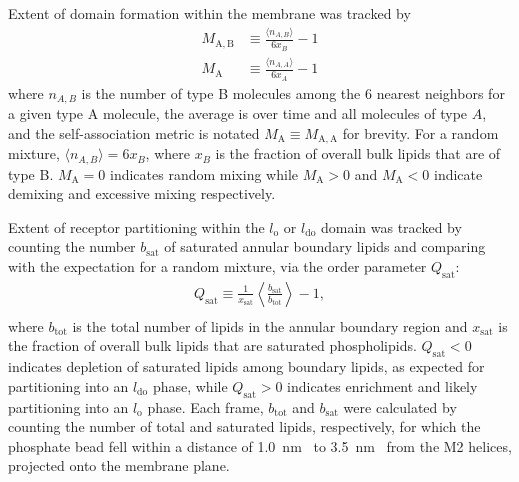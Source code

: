 \documentclass[final,3p,times,twocolumn]{elsarticle}
\newcommand{\bsat}{b_{\mathrm{sat}}}
\newcommand{\qsat}{Q_{\mathrm{sat}}}
\newcommand{\xsat}{x_{\mathrm{sat}}}
\newcommand{\nbound}{b_{\mathrm{tot}}}
\newcommand{\lo}{l_{\mathrm{o}}}
\newcommand{\ldo}{l_{\mathrm{do}}}
\newcommand{\m}[2]{M_{\mathrm{{#1},{#2}}}}
\newcommand{\mself}[1]{M_{\mathrm{#1}}}
\begin{document}
Extent of domain formation within the membrane was tracked by 
    \begin{equation}
    \begin{aligned}
      \m{A}{B} &\equiv \frac{\langle n_{A,B} \rangle} {6x_{B}} -1 \\
      \mself{A} &\equiv \frac{\langle n_{A,A} \rangle} {6x_{A}} -1 
    \end{aligned}
    \label{eq:M}
  \end{equation}
 where $n_{A,B}$ is the number of type B molecules among the 6 nearest neighbors for a given type A molecule,  the average is over time and all molecules of type $A$, and the self-association metric is notated $\mself{A} \equiv \m{A}{A}$ for brevity. For a random mixture, $\langle n_{A,B} \rangle = 6x_{B}$, where $x_{B}$ is the fraction of overall bulk lipids that are of type B. ${\mself{A}=0}$ indicates random mixing while ${\mself{A}>0}$  and ${\mself{A}<0}$ indicate demixing and excessive mixing respectively.  


Extent of receptor partitioning within the $\lo$ or $\ldo$ domain was tracked by counting the number $\bsat$ of saturated annular boundary lipids and comparing with the expectation for a random mixture, via the order parameter $\qsat$:
  \begin{equation}
    \begin{aligned}
      \qsat\equiv \frac{1}{\xsat}\left\langle\frac{  \bsat }{\nbound }\right\rangle-1,\\
    \end{aligned}
    \label{eq:Q}
  \end{equation}
  where $\nbound$ is the total number of lipids in the annular boundary region and $\xsat$ is the fraction of overall bulk lipids that are saturated phospholipids. $\qsat <0$ indicates depletion of saturated lipids among boundary lipids, as expected for partitioning into an $\ldo$ phase, while $\qsat>0$ indicates enrichment and likely partitioning into an $\lo$ phase. Each frame, $\nbound$ and $\bsat$ were calculated by counting the number of total and saturated lipids, respectively, for which the phosphate bead fell within a distance of 1.0~nm~ to 3.5~nm~ from the M2 helices, projected onto the membrane plane. 
  
\end{document}
